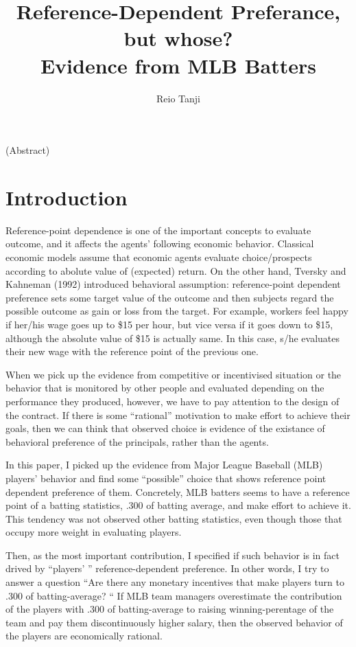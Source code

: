 \documentclass[dvipdfmx]{article}
\begin{document}
\title{Reference-Dependent Preferance, but whose? \\
Evidence from MLB Batters}
\author{Reio Tanji}
\date{}
\maketitle

\large

\begin{center}
  (Abstract)
\end{center}


\section{Introduction}

Reference-point dependence is one of the important concepts to
evaluate outcome, and it affects the agents' following
economic behavior. Classical economic models assume that
economic agents evaluate choice/prospects according to abolute
value of (expected) return. On the other hand, Tversky and
Kahneman (1992) introduced behavioral
assumption: reference-point dependent preference sets some
target value of the outcome and then subjects regard the
possible outcome as gain or loss from the target.
For example, workers feel happy if her/his wage goes up
to \$15 per hour, but vice versa if it goes down to \$15,
although the absolute value of \$15 is actually same. In this case,
s/he evaluates their new wage with the reference point of
the previous one.

When we pick up the evidence from competitive or incentivised
situation or the behavior that is monitored by other people
and evaluated depending on the performance they produced,
however, we have to pay attention  to the design of the contract.
If there is some ``rational''
motivation to make effort to achieve their goals,
then we can think that observed
choice is evidence of the existance of behavioral preference of
the principals, rather than the agents.

In this paper, I picked up the evidence from Major League Baseball
(MLB) players' behavior and find some ``possible'' choice that
shows reference point dependent preference of them.
Concretely, MLB batters seems to have a reference point of
a batting statistics, .300 of batting average, and make effort
to achieve it. This tendency was not observed other batting statistics,
even though those that occupy more weight in evaluating players.

Then, as the most important contribution, I specified if
such behavior is in fact drived by ``players' ''
reference-dependent preference. In other words, I try to answer
a question ``Are there any monetary incentives that make players
turn to .300 of batting-average? `` If MLB team managers overestimate
the contribution of the players with .300 of batting-average to
raising winning-perentage of the team and pay them discontinuously
higher salary, then the observed behavior of the players are
economically rational.
\end{document}
